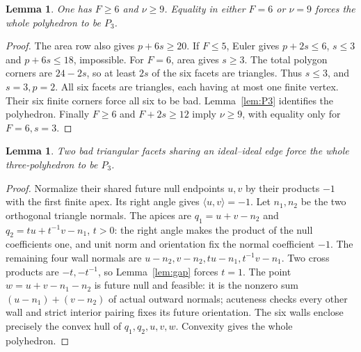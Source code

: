 \documentclass[11pt]{article}
\newtheorem{lemma}[theorem]{Lemma}
\newcommand{\ip}[2]{\langle #1,#2\rangle}
\newcommand{\Pthree}{P_3}
\begin{document}
\begin{lemma}\label{lem:min3}
One has $F\ge6$ and $\nu\ge9$. Equality in either $F=6$ or
$\nu=9$ forces the whole polyhedron to be $\Pthree$.
\end{lemma}
\begin{proof}
The area row also gives $p+6s\ge20$. If $F\le5$, Euler gives
$p+2s\le6$, $s\le3$ and $p+6s\le18$, impossible.
For $F=6$, area gives $s\ge3$. The total polygon corners are
$24-2s$, so at least $2s$ of the six facets are triangles.
Thus $s\le3$, and $s=3,p=2$. All six facets are triangles, each
having at most one finite vertex. Their six finite corners force all
six to be bad. Lemma~\ref{lem:P3} identifies the polyhedron.
Finally $F\ge6$ and $F+2s\ge12$ imply $\nu\ge9$, with equality
only for $F=6,s=3$.
\end{proof}

\begin{lemma}\label{lem:attach}
Two bad triangular facets sharing an ideal--ideal edge force the
whole three-polyhedron to be $\Pthree$.
\end{lemma}
\begin{proof}
Normalize their shared future null endpoints $u,v$ by their products
$-1$ with the first finite apex. Its right angle gives $\ip{u}{v}=-1$.
Let $n_1,n_2$ be the two orthogonal triangle normals. The apices are
$q_1=u+v-n_2$ and $q_2=t u+t^{-1}v-n_1$, $t>0$:
the right angle makes the product of the null coefficients one,
and unit norm and orientation fix the normal coefficient $-1$.
The remaining four wall normals are
$u-n_2,v-n_2,t u-n_1,t^{-1}v-n_1$.
Two cross products are $-t,-t^{-1}$, so Lemma~\ref{lem:gap}
forces $t=1$. The point $w=u+v-n_1-n_2$ is future null and feasible:
it is the nonzero sum $(u-n_1)+(v-n_2)$ of actual outward normals;
acuteness checks every other wall and strict interior pairing fixes
its future orientation. The six walls enclose precisely the convex
hull of $q_1,q_2,u,v,w$. Convexity gives the whole polyhedron.
\end{proof}
\end{document}

